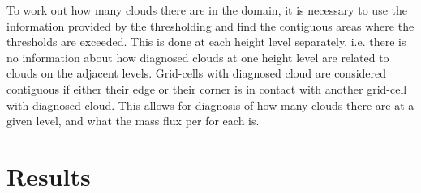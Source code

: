 \documentclass[11pt,a4paper]{article}
\newcommand*\mean[1]{\overline{#1}}
\newcommand\todo[1]{\textbf{TODO: #1}}
\begin{document}
To work out how many clouds there are in the domain, it is necessary to use the information provided by the thresholding and find the contiguous areas where the thresholds are exceeded. This is done at each height level separately, i.e. there is no information about how diagnosed clouds at one height level are related to clouds on the adjacent levels. Grid-cells with diagnosed cloud are considered contiguous if either their edge or their corner is in contact with another grid-cell with diagnosed cloud. This allows for diagnosis of how many clouds there are at a given level, and what the mass flux per for each is.

\newpage
\section{Results}

%
\end{document}
